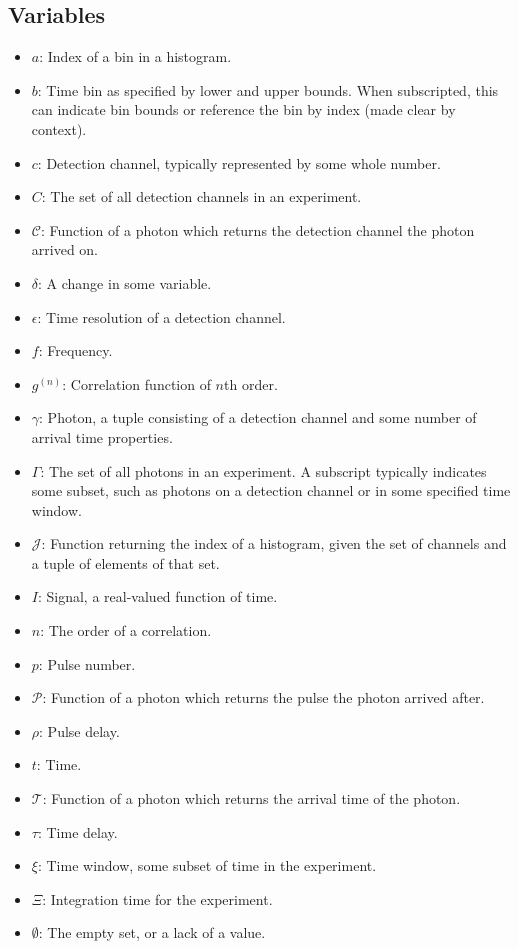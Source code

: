 \documentclass{article}
\newcommand{\gn}[1]{\ensuremath{g^{(#1)}}}
\newcommand{\channel}{\ensuremath{c}}
\newcommand{\channels}{\ensuremath{C}}
\newcommand{\Channel}{\ensuremath{\mathcal{C}}}
\newcommand{\Time}{\ensuremath{\mathcal{T}}}
\newcommand{\photon}{\ensuremath{\gamma}}
\newcommand{\photons}{\ensuremath{\Gamma}}
\newcommand{\Pulse}{\ensuremath{\mathcal{P}}}
\newcommand{\integrationtime}{\ensuremath{\Xi}}
\newcommand{\timewindow}{\ensuremath{\xi}}
\newcommand{\resolution}{\ensuremath{\epsilon}}
\newcommand{\Index}{\ensuremath{\mathcal{J}}}
\newcommand{\Histogram}{\ensuremath{\mathcal{H}}}
\begin{document}
\begin{appendix}
\subsection{Variables}
\begin{itemize}
\item $a$: Index of a bin in a histogram.
\item $b$: Time bin as specified by lower and upper bounds. When subscripted, this can indicate bin bounds or reference the bin by index (made clear by context).
\item $\channel$: Detection channel, typically represented by some whole number.
\item $\channels$: The set of all detection channels in an experiment.
\item $\Channel$: Function of a photon which returns the detection channel the photon arrived on.
\item $\delta$: A change in some variable.
\item $\resolution$: Time resolution of a detection channel.
\item $f$: Frequency.
\item $\gn{n}$: Correlation function of $n$th order.
\item $\photon$: Photon, a tuple consisting of a detection channel and some number of arrival time properties.
\item $\photons$: The set of all photons in an experiment. A subscript typically indicates some subset, such as photons on a detection channel or in some specified time window.
\item $\Index$: Function returning the index of a histogram, given the set of channels and a tuple of elements of that set.
\item $I$: Signal, a real-valued function of time.
\item $n$: The order of a correlation.
\item $p$: Pulse number.
\item $\Pulse$: Function of a photon which returns the pulse the photon arrived after.
\item $\rho$: Pulse delay.
\item $t$: Time.
\item $\Time$: Function of a photon which returns the arrival time of the photon.
\item $\tau$:  Time delay.
\item $\timewindow$: Time window, some subset of time in the experiment.
\item $\integrationtime$: Integration time for the experiment.
\item $\emptyset$: The empty set, or a lack of a value.
\end{itemize}


\end{appendix}
\end{document}
